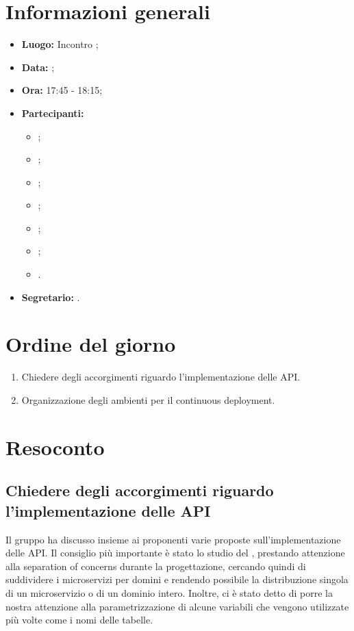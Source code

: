 \section{Informazioni generali}
\begin{itemize}
\item \textbf{Luogo:} Incontro ;
\item \textbf{Data:} \Data;
\item \textbf{Ora:} 17:45 - 18:15;
\item \textbf{Partecipanti:}
	\begin{itemize}
		\item \BL{}; 
		\item \FF{};
		\item \MM{};
		\item \TG{};
		\item \PC{};
		\item \TL{};
		\item \Proponente{}.
	\end{itemize}
\item \textbf{Segretario:} \MM{}.
\end{itemize}

\section{Ordine del giorno}
\begin{enumerate}
	\item Chiedere degli accorgimenti riguardo l'implementazione delle API.
	\item Organizzazione degli ambienti per il continuous deployment.
\end{enumerate}

\section{Resoconto}
\subsection{Chiedere degli accorgimenti riguardo l'implementazione delle API}
Il gruppo ha discusso insieme ai proponenti varie proposte sull'implementazione delle API. Il consiglio più importante è stato lo studio del , prestando attenzione alla separation of concerns durante la progettazione, cercando quindi di suddividere i microservizi per domini e rendendo possibile la distribuzione singola di un microservizio o di un dominio intero. Inoltre, ci è stato detto di porre la nostra attenzione alla parametrizzazione di alcune variabili che vengono utilizzate più volte come i nomi delle tabelle.

